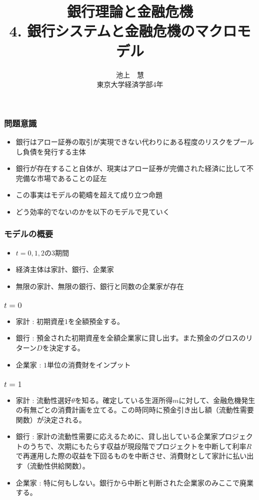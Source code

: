 \documentclass[dvipdfmx, 12pt]{beamer}
\title{銀行理論と金融危機\\4. 銀行システムと金融危機のマクロモデル}
\author{池上　慧 \\ 東京大学経済学部4年}
\begin{document}
\newcommand{\argmin}{\mathop{\rm arg~min}\limits}

\frame{\maketitle}

\begin{frame}\frametitle{問題意識}
	\begin{itemize}
		\item 銀行はアロー証券の取引が実現できない代わりにある程度のリスクをプールし負債を発行する主体
		\item 銀行が存在すること自体が、現実はアロー証券が完備された経済に比して不完備な市場であることの証左
		\item この事実はモデルの範疇を超えて成り立つ命題
		\item どう効率的でないのかを以下のモデルで見ていく
	\end{itemize}
\end{frame}

\begin{frame}\frametitle{モデルの概要}
	\begin{itemize}
		\item $t = 0,1,2$の3期間
		\item 経済主体は家計、銀行、企業家
		\item 無限の家計、無限の銀行、銀行と同数の企業家が存在
	\end{itemize}
\end{frame}

\begin{frame}\frametitle{$t = 0$}
	\begin{itemize}
		\item 家計 : 初期資産$1$を全額預金する。
		\item 銀行 : 預金された初期資産を全額企業家に貸し出す。また預金のグロスのリターン$D$を決定する。
		\item 企業家 : $1$単位の消費財をインプット
	\end{itemize}
\end{frame}

\begin{frame}\frametitle{$t = 1$}
	\begin{itemize}
		\item 家計 : 流動性選好$\theta$を知る。確定している生涯所得$m$に対して、金融危機発生の有無ごとの消費計画を立てる。この時同時に預金引き出し額（流動性需要関数）が決定される。
		\item 銀行 : 家計の流動性需要に応えるために、貸し出している企業家プロジェクトのうちで、次期にもたらす収益が現段階でプロジェクトを中断して利率$R$で再運用した際の収益を下回るものを中断させ、消費財として家計に払い出す（流動性供給関数）。
		\item 企業家 : 特に何もしない。銀行から中断と判断された企業家のみここで廃業する。
	\end{itemize}
\end{frame}
\end{document}

